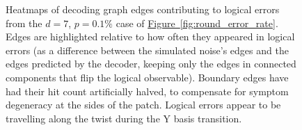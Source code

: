 \documentclass[onecolumn,unpublished,a4paper]{quantumarticle}
\theoremstyle{definition}
\theoremstyle{definition}
\theoremstyle{definition}
\newcommand{\fig}[1]{\hyperref[fig:#1]{Figure~\ref*{fig:#1}}}
\begin{document}
\begin{figure}
    \centering
    \caption{
        Heatmaps of decoding graph edges contributing to logical errors from the $d=7$, $p=0.1\%$ case of \fig{round_error_rate}.
        Edges are highlighted relative to how often they appeared in logical errors (as a difference between the simulated noise's edges and the edges predicted by the decoder, keeping only the edges in connected components that flip the logical observable).
        Boundary edges have had their hit count artificially halved, to compensate for symptom degeneracy at the sides of the patch.
        Logical errors appear to be travelling along the twist during the Y basis transition.
    }
    \label{fig:error_heat}
\end{figure}
\end{document}
